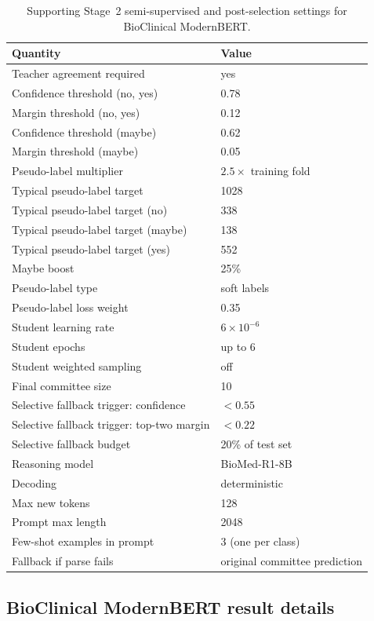 \documentclass{article}
\begin{document}
\begin{table}[H]
\centering
\caption{Supporting Stage~2 semi-supervised and post-selection settings for BioClinical ModernBERT.}
\label{tab:bcb_appendix_stage2}
\small
\begin{tabular}{ll}
\hline
\textbf{Quantity} & \textbf{Value} \\
\hline
Teacher agreement required & yes \\
Confidence threshold (no, yes) & 0.78 \\
Margin threshold (no, yes) & 0.12 \\
Confidence threshold (maybe) & 0.62 \\
Margin threshold (maybe) & 0.05 \\
Pseudo-label multiplier & $2.5\times$ training fold \\
Typical pseudo-label target & 1028 \\
Typical pseudo-label target (no) & 338 \\
Typical pseudo-label target (maybe) & 138 \\
Typical pseudo-label target (yes) & 552 \\
Maybe boost & 25\% \\
Pseudo-label type & soft labels \\
Pseudo-label loss weight & 0.35 \\
Student learning rate & $6\times10^{-6}$ \\
Student epochs & up to 6 \\
Student weighted sampling & off \\
Final committee size & 10 \\
Selective fallback trigger: confidence & $<0.55$ \\
Selective fallback trigger: top-two margin & $<0.22$ \\
Selective fallback budget & 20\% of test set \\
Reasoning model & BioMed-R1-8B \\
Decoding & deterministic \\
Max new tokens & 128 \\
Prompt max length & 2048 \\
Few-shot examples in prompt & 3 (one per class) \\
Fallback if parse fails & original committee prediction \\
\hline
\end{tabular}
\end{table}

\subsection{BioClinical ModernBERT result details}
\label{app:bcb_additional_results}
\end{document}
